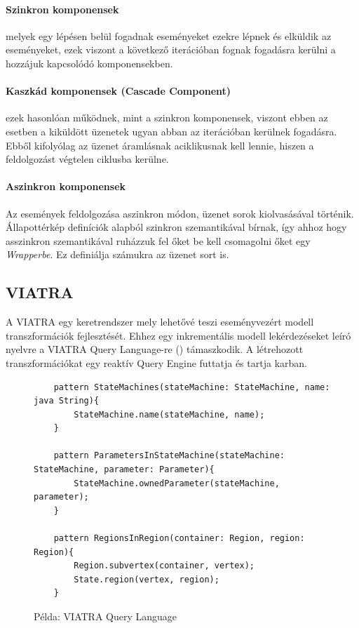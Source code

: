 \paragraph{Szinkron komponensek} melyek egy lépésen belül fogadnak eseményeket ezekre lépnek és elküldik az eseményeket, ezek viszont a következő iterációban fognak fogadásra kerülni a hozzájuk kapcsolódó komponensekben.

\paragraph{Kaszkád komponensek (Cascade Component)} ezek hasonlóan működnek, mint a szinkron komponensek, viszont ebben az esetben a kiküldött üzenetek ugyan abban az iterációban kerülnek fogadásra. Ebből kifolyólag az üzenet áramlásnak aciklikusnak kell lennie, hiszen a feldolgozást végtelen ciklusba kerülne.

\paragraph{Aszinkron komponensek} Az események feldolgozása aszinkron módon, üzenet sorok kiolvasásával történik. Állapottérkép definíciók alapból szinkron szemantikával bírnak, így ahhoz hogy asszinkron szemantikával ruházzuk fel őket be kell csomagolni őket egy \emph{Wrapperbe}. Ez definiálja számukra az üzenet sort is.

\newpage
{}

\subsection[]{VIATRA\footnotemark}


A VIATRA egy keretrendszer mely lehetővé teszi eseményvezért modell transzformációk fejlesztését. Ehhez egy inkrementális modell lekérdezéseket leíró nyelvre a VIATRA Query Language-re () támaszkodik. A létrehozott transzformációkat egy reaktív Query Engine futtatja és tartja karban.

\begin{figure}[!ht]
	\begin{lstlisting}
	pattern StateMachines(stateMachine: StateMachine, name: java String){
	    StateMachine.name(stateMachine, name);
	}
	
	pattern ParametersInStateMachine(stateMachine: StateMachine, parameter: Parameter){
    	StateMachine.ownedParameter(stateMachine, parameter);
	}
	
	pattern RegionsInRegion(container: Region, region: Region){
	    Region.subvertex(container, vertex);
    	State.region(vertex, region);
	}
	\end{lstlisting}
	\caption{Példa: VIATRA Query Language}
	\label{fig:vql}
\end{figure}


